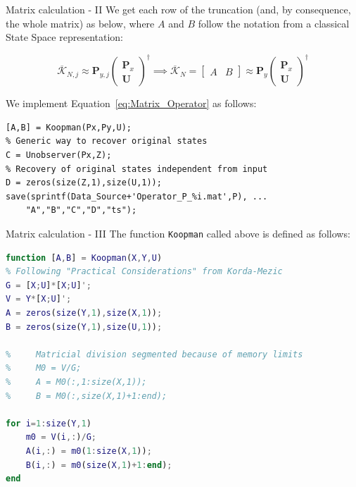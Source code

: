 \documentclass{beamer}
\begin{document}
\begin{frame}[fragile]{Matrix calculation - II}
    We get each row of the truncation (and, by consequence, the whole matrix) as below, where $A$ and $B$ follow the notation from a classical State Space representation:

    \begin{equation} \label{eq:Matrix_Operator}
        \overline{\mathcal{K}}_{N,j} \approx \mathbf{P}_{y,j} \begin{pmatrix}
            \mathbf{P}_x \\
            \mathbf{U}
        \end{pmatrix}^\dagger \implies \overline{\mathcal{K}}_N = 
        \begin{bmatrix}
            A & B
        \end{bmatrix}
        \approx \mathbf{P}_y
        \begin{pmatrix}
            \mathbf{P}_x \\
            \mathbf{U}
        \end{pmatrix}^\dagger
    \end{equation}
    
    We implement Equation~\ref{eq:Matrix_Operator} as follows:

    \begin{lstlisting}
[A,B] = Koopman(Px,Py,U);
% Generic way to recover original states
C = Unobserver(Px,Z);
% Recovery of original states independent from input
D = zeros(size(Z,1),size(U,1));
save(sprintf(Data_Source+'Operator_P_%i.mat',P), ...
    "A","B","C","D","ts");
    \end{lstlisting}
\end{frame}

\begin{frame}[fragile]{Matrix calculation - III}
    The function \texttt{Koopman} called above is defined as follows:

    \begin{lstlisting}[language=Matlab,basicstyle=\tiny]
function [A,B] = Koopman(X,Y,U)
% Following "Practical Considerations" from Korda-Mezic
G = [X;U]*[X;U]';
V = Y*[X;U]';
A = zeros(size(Y,1),size(X,1));
B = zeros(size(Y,1),size(U,1));

%     Matricial division segmented because of memory limits
%     M0 = V/G;
%     A = M0(:,1:size(X,1));
%     B = M0(:,size(X,1)+1:end);

for i=1:size(Y,1)
    m0 = V(i,:)/G;
    A(i,:) = m0(1:size(X,1));
    B(i,:) = m0(size(X,1)+1:end);
end
    \end{lstlisting}
\end{frame}
\end{document}
